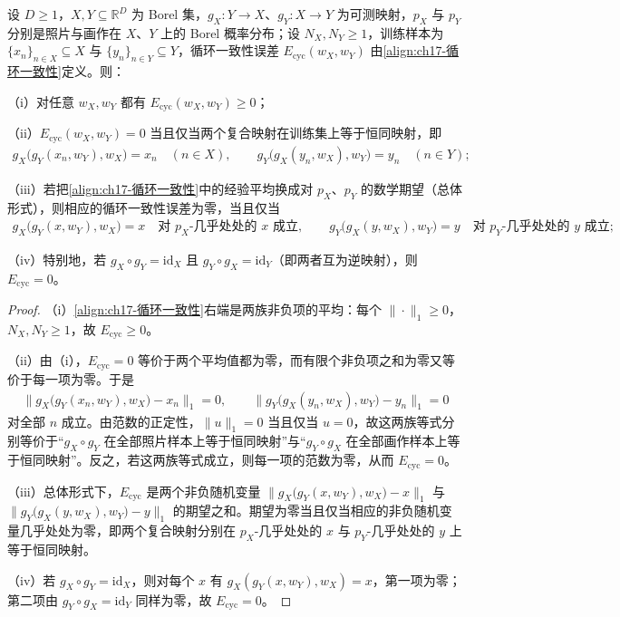 \documentclass[../../main.tex]{subfiles}
\begin{document}
\begin{proposition}[循环一致性误差的性质]\label{proposition:ch17-循环一致性}
设 $D\geqslant1$，$X,Y\subseteq\mathbb{R}^D$ 为 Borel 集，$g_X:Y\to X$、$g_Y:X\to Y$ 为可测映射，$p_X$ 与 $p_Y$ 分别是照片与画作在 $X$、$Y$ 上的 Borel 概率分布；设 $N_X,N_Y\geqslant1$，训练样本为 $\{x_n\}_{n\in X}\subseteq X$ 与 $\{y_n\}_{n\in Y}\subseteq Y$，循环一致性误差 $E_{\mathrm{cyc}}(w_X,w_Y)$ 由\eqref{align:ch17-循环一致性}定义。则：

（i）对任意 $w_X,w_Y$ 都有 $E_{\mathrm{cyc}}(w_X,w_Y)\geqslant0$；

（ii）$E_{\mathrm{cyc}}(w_X,w_Y)=0$ 当且仅当两个复合映射在训练集上等于恒同映射，即
\begin{align*}
g_X\big(g_Y(x_n,w_Y),w_X\big)=x_n\quad(n\in X),\qquad
g_Y\big(g_X(y_n,w_X),w_Y\big)=y_n\quad(n\in Y);
\end{align*}

（iii）若把\eqref{align:ch17-循环一致性}中的经验平均换成对 $p_X$、$p_Y$ 的数学期望（总体形式），则相应的循环一致性误差为零，当且仅当
\begin{align*}
g_X\big(g_Y(x,w_Y),w_X\big)=x\quad\text{对 }p_X\text{-几乎处处的 }x\text{ 成立},\qquad
g_Y\big(g_X(y,w_X),w_Y\big)=y\quad\text{对 }p_Y\text{-几乎处处的 }y\text{ 成立};
\end{align*}

（iv）特别地，若 $g_X\circ g_Y=\mathrm{id}_X$ 且 $g_Y\circ g_X=\mathrm{id}_Y$（即两者互为逆映射），则 $E_{\mathrm{cyc}}=0$。
\end{proposition}

\begin{proof}
（i）\eqref{align:ch17-循环一致性}右端是两族非负项的平均：每个 $\|\cdot\|_1\geqslant0$，$N_X,N_Y\geqslant1$，故 $E_{\mathrm{cyc}}\geqslant0$。

（ii）由（i），$E_{\mathrm{cyc}}=0$ 等价于两个平均值都为零，而有限个非负项之和为零又等价于每一项为零。于是
\begin{align*}
\big\|g_X\big(g_Y(x_n,w_Y),w_X\big)-x_n\big\|_1=0,\qquad
\big\|g_Y\big(g_X(y_n,w_X),w_Y\big)-y_n\big\|_1=0
\end{align*}
对全部 $n$ 成立。由范数的正定性，$\|u\|_1=0$ 当且仅当 $u=0$，故这两族等式分别等价于“$g_X\circ g_Y$ 在全部照片样本上等于恒同映射”与“$g_Y\circ g_X$ 在全部画作样本上等于恒同映射”。反之，若这两族等式成立，则每一项的范数为零，从而 $E_{\mathrm{cyc}}=0$。

（iii）总体形式下，$E_{\mathrm{cyc}}$ 是两个非负随机变量 $\big\|g_X\big(g_Y(x,w_Y),w_X\big)-x\big\|_1$ 与 $\big\|g_Y\big(g_X(y,w_X),w_Y\big)-y\big\|_1$ 的期望之和。期望为零当且仅当相应的非负随机变量几乎处处为零，即两个复合映射分别在 $p_X$-几乎处处的 $x$ 与 $p_Y$-几乎处处的 $y$ 上等于恒同映射。

（iv）若 $g_X\circ g_Y=\mathrm{id}_X$，则对每个 $x$ 有 $g_X(g_Y(x,w_Y),w_X)=x$，第一项为零；第二项由 $g_Y\circ g_X=\mathrm{id}_Y$ 同样为零，故 $E_{\mathrm{cyc}}=0$。
\end{proof}
\end{document}
